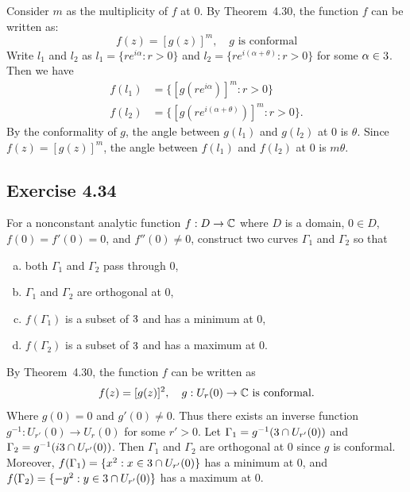\documentclass{article}
\begin{document}
\begin{solution}
  Consider $m$ as the multiplicity of $f$ at $0$. By Theorem~4.30,
  the function $f$ can be written as:
  \[
    f(z) = [g(z)]^m,\quad g \text{ is conformal}
  \]
  Write $l_1$ and $l_2$ as $l_1 = \{re^{i\alpha} : r > 0\}$ and
  $l_2 = \{re^{i(\alpha + \theta)} : r > 0\}$ for some $\alpha \in
  3$. Then we have
  \[
    \begin{aligned}
      f(l_1) &= \{[g(re^{i\alpha})]^m : r > 0\} \\
      f(l_2) &= \{[g(re^{i(\alpha + \theta)})]^m : r > 0\}.
    \end{aligned}
  \]
  By the conformality of $g$, the angle between $g(l_1)$ and $g(l_2)$
  at $0$ is $\theta$. Since $f(z) = [g(z)]^m$, the angle between
  $f(l_1)$ and $f(l_2)$ at $0$ is $m\theta$.
\end{solution}

\subsection{Exercise 4.34}

For a nonconstant analytic function $f : D \to \mathbb{C}$ where $D$ is a
domain, $0 \in D$, $f(0) = f'(0) = 0$, and $f''(0) \ne 0$,
construct two curves $\Gamma_1$ and $\Gamma_2$ so that
\begin{enumerate}[(a)]
  \item both $\Gamma_1$ and $\Gamma_2$ pass through $0$,
  \item $\Gamma_1$ and $\Gamma_2$ are orthogonal at $0$,
  \item $f(\Gamma_1)$ is a subset of $3$ and has a minimum at $0$,
  \item $f(\Gamma_2)$ is a subset of $3$ and has a maximum at $0$.
\end{enumerate}

\begin{solution}
  By Theorem~4.30, the function $f$ can be written as
  \[
    f(z) = [g(z)]^2, \quad g: U_r(0) \to \mathbb{C} \text{ is conformal}.
  \]
  Where $g(0) = 0$ and $g'(0) \ne 0$. Thus there exists an inverse function
  $g^{-1} : U_{r'}(0) \to U_r(0)$ for some $r' > 0$. Let $\Gamma_1 =
  g^{-1}(3 \cap U_{r'}(0))$ and $\Gamma_2 = g^{-1}(i3 \cap
  U_{r'}(0))$. Then $\Gamma_1$ and $\Gamma_2$ are orthogonal at $0$
  since $g$ is conformal. Moreover, $f(\Gamma_1) = \{x^2 : x \in 3
  \cap U_{r'}(0)\}$ has a minimum at $0$, and $f(\Gamma_2) = \{-y^2 :
  y \in 3 \cap U_{r'}(0)\}$ has a maximum at $0$.
\end{solution}
\end{document}
